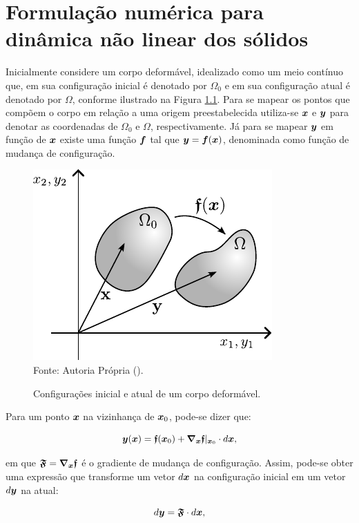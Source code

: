 \chapter{Formulação numérica para dinâmica não linear dos sólidos} \label{EGDS}

Inicialmente considere um corpo deformável, idealizado como um meio contínuo que, em sua configuração inicial é denotado por $\Omega_0$ e em sua configuração atual é denotado por $\Omega$, conforme ilustrado na Figura \ref{fig:Cont}. Para se mapear os pontos que compõem o corpo em relação a uma origem preestabelecida utiliza-se $\boldsymbol{x}$ e $\boldsymbol{y}$ para denotar as coordenadas de $\Omega_0$ e $\Omega$, respectivamente. Já para se mapear $\boldsymbol{y}$ em função de $\boldsymbol{x}$ existe uma função $\boldsymbol{f}$ tal que $\boldsymbol{y}=\boldsymbol{f}(\boldsymbol{x})$, denominada como função de mudança de configuração.

\begin{figure}[h!]
    \centering
    \caption{Configurações inicial e atual de um corpo deformável.}
    \includegraphics[width=.4\linewidth]{Figuras/Cont.pdf}
    \\Fonte: Autoria Própria (\the\year).
    \label{fig:Cont}
\end{figure}

Para um ponto $\boldsymbol{x}$ na vizinhança de $\boldsymbol{x}_0$, pode-se dizer que:

\begin{equation}
    \boldsymbol{y}(\boldsymbol{x})=\boldsymbol{\mathfrak{f}}(\boldsymbol{x}_0)+\boldsymbol{\nabla_x}\boldsymbol{\mathfrak{f}}|_{\boldsymbol{x}_0}\cdot d\boldsymbol{x}\text{,}
\end{equation}

\noindent em que $\boldsymbol{\mathfrak{F}}=\boldsymbol{\nabla_x}\boldsymbol{\mathfrak{f}}$ é o gradiente de mudança de configuração. Assim, pode-se obter uma expressão que transforme um vetor $d\boldsymbol{x}$ na configuração inicial em um vetor $d\boldsymbol{y}$ na atual:

\begin{equation}
    d\boldsymbol{y}=\boldsymbol{\mathfrak{F}}\cdot d\boldsymbol{x}\text{,}\label{eq:dyAdx}
\end{equation}

